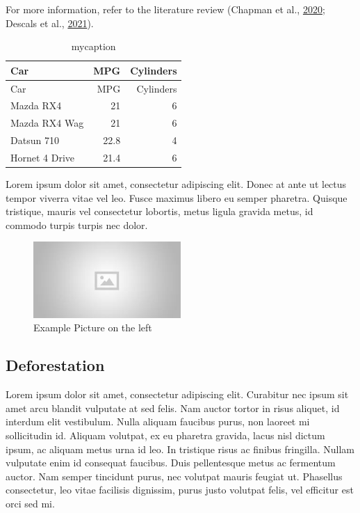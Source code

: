\documentclass[
]{article}
\begin{document}
For more information, refer to the literature review (Chapman et al.,
\protect\hyperlink{ref-chapmanCompoundingImpactDeforestation2020}{2020};
Descals et al.,
\protect\hyperlink{ref-descalsHighresolutionGlobalMap2021}{2021}).

\hypertarget{tbl-mytable2}{}
\begin{longtable}[]{@{}lrr@{}}
\caption{\label{tbl-mytable2}mycaption}\tabularnewline
\toprule\noalign{}
Car & MPG & Cylinders \\
\midrule\noalign{}
\endfirsthead
\toprule\noalign{}
Car & MPG & Cylinders \\
\midrule\noalign{}
\endhead
\bottomrule\noalign{}
\endlastfoot
Mazda RX4 & 21 & 6 \\
Mazda RX4 Wag & 21 & 6 \\
Datsun 710 & 22.8 & 4 \\
Hornet 4 Drive & 21.4 & 6 \\
\end{longtable}

Lorem ipsum dolor sit amet, consectetur adipiscing elit. Donec at ante
ut lectus tempor viverra vitae vel leo. Fusce maximus libero eu semper
pharetra. Quisque tristique, mauris vel consectetur lobortis, metus
ligula gravida metus, id commodo turpis turpis nec dolor.

\begin{figure}

\includegraphics[width=0.5\textwidth,height=\textheight]{placeholder.jpg} \hfill{}

\caption{Example Picture on the left}

\end{figure}

\hypertarget{deforestation}{%
\subsection{Deforestation}\label{deforestation}}

Lorem ipsum dolor sit amet, consectetur adipiscing elit. Curabitur nec
ipsum sit amet arcu blandit vulputate at sed felis. Nam auctor tortor in
risus aliquet, id interdum elit vestibulum. Nulla aliquam faucibus
purus, non laoreet mi sollicitudin id. Aliquam volutpat, ex eu pharetra
gravida, lacus nisl dictum ipsum, ac aliquam metus urna id leo. In
tristique risus ac finibus fringilla. Nullam vulputate enim id consequat
faucibus. Duis pellentesque metus ac fermentum auctor. Nam semper
tincidunt purus, nec volutpat mauris feugiat ut. Phasellus consectetur,
leo vitae facilisis dignissim, purus justo volutpat felis, vel efficitur
est orci sed mi.
\end{document}
